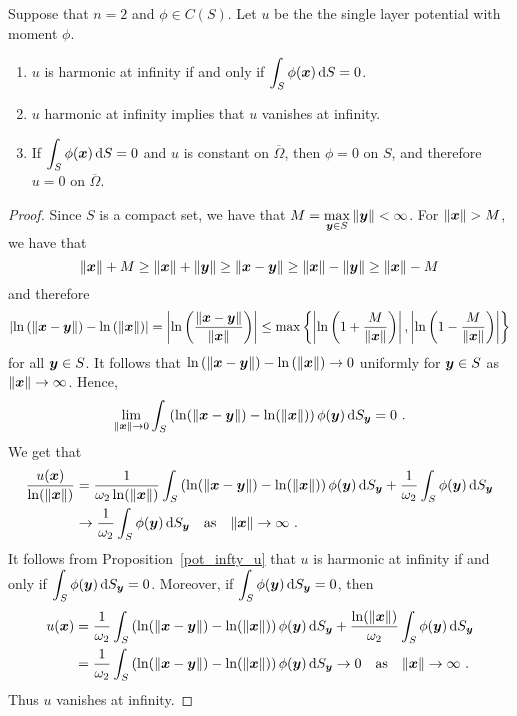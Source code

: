 \begin{lemma} \label{pot_1to1n2}
Suppose that $n=2$ and $\phi \in C(S)$.  Let $u$ be the
the single layer potential with moment $\phi$.
\begin{enumerate}
\item $u$ is harmonic at infinity if and only if
$\displaystyle \int_{S} \phi({\bm{x}}) \,\mathrm{d}{S} =0$.
\item $u$ harmonic at infinity implies that $u$ vanishes at infinity.
\item If $\displaystyle \int_{S} \phi({\bm{x}}) \,\mathrm{d}{S} =0$
and $u$ is constant on $\overline{\Omega}$, then $\phi=0$ on
$S$, and therefore $u=0$ on $\overline{\Omega}$.
\end{enumerate}
\end{lemma}

\begin{proof}
Since $S$ is a compact set, we have that
$\displaystyle M = \max_{{\bm{y}} \in S} \|{\bm{y}}\| < \infty$.
For $\|{\bm{x}}\| > M$, we have that
\[
\|{\bm{x}}\| + M \geq \|{\bm{x}}\| + \|{\bm{y}}\| \geq \|{\bm{x}} - {\bm{y}} \|
\geq \|{\bm{x}}\| - \|{\bm{y}}\|
\geq \|{\bm{x}}\| - M
\]
and therefore
\[
\left| \ln\left(\|{\bm{x}}-{\bm{y}}\|\right) -
\ln\left(\|{\bm{x}}\|\right) \right|
= \left| \ln\left(\frac{\|{\bm{x}}-{\bm{y}}\|}{\|{\bm{x}}\|}\right) \right|
\leq \max \left\{
\left| \ln\left(1 + \frac{M}{\|{\bm{x}}\|}\right) \right|,
\left| \ln\left(1 - \frac{M}{\|{\bm{x}}\|}\right) \right| \right\}
\]
for all ${\bm{y}} \in S$.   It follows that
$\ln\left(\|{\bm{x}}-{\bm{y}}\|\right) - \ln\left(\|{\bm{x}}\|\right) \to 0$
uniformly for ${\bm{y}} \in S$ as $\|{\bm{x}}\| \to \infty$.
Hence,
\[
\lim_{\|{\bm{x}}\|\to 0} \int_S \left( \ln(\|{\bm{x}}-{\bm{y}}\|) - \ln(\|{\bm{x}}\|)
\right) \phi({\bm{y}}) \,\mathrm{d}{S}_{{\bm{y}}} = 0 \ .
\]
We get that
\begin{align*}
\frac{u({\bm{x}})}{\ln(\|{\bm{x}}\|)}
&= \frac{1}{\omega_2 \ln(\|{\bm{x}}\|)}
\int_S \left( \ln(\|{\bm{x}}-{\bm{y}}\|) - \ln(\|{\bm{x}}\|)
\right) \phi({\bm{y}}) \,\mathrm{d}{S}_{{\bm{y}}}
+ \frac{1}{\omega_2} \int_S \phi({\bm{y}}) \,\mathrm{d}{S}_{{\bm{y}}} \\
&\to \frac{1}{\omega_2} \int_S \phi({\bm{y}}) \,\mathrm{d}{S}_{{\bm{y}}}
\quad \text{as} \quad \|{\bm{x}}\| \to \infty \ .
\end{align*}
It follows from Proposition~\ref{pot_infty_u} that $u$ is harmonic at
infinity if and only if
$\displaystyle \int_S \phi({\bm{y}}) \,\mathrm{d}{S}_{{\bm{y}}} = 0$.
Moreover, if $\displaystyle \int_S \phi({\bm{y}}) \,\mathrm{d}{S}_{{\bm{y}}} = 0$, then
\begin{align*}
u({\bm{x}})
&= \frac{1}{\omega_2}
\int_S \left( \ln(\|{\bm{x}}-{\bm{y}}\|) - \ln(\|{\bm{x}}\|)
\right) \phi({\bm{y}}) \,\mathrm{d}{S}_{{\bm{y}}}
+ \frac{\ln(\|{\bm{x}}\|)}{\omega_2} \int_S \phi({\bm{y}}) \,\mathrm{d}{S}_{{\bm{y}}} \\
&= \frac{1}{\omega_2}
\int_S \left( \ln(\|{\bm{x}}-{\bm{y}}\|) - \ln(\|{\bm{x}}\|)
\right) \phi({\bm{y}}) \,\mathrm{d}{S}_{{\bm{y}}}
\to 0 \quad \text{as} \quad \|{\bm{x}}\| \to \infty \ .
\end{align*}
Thus $u$ vanishes at infinity.


\end{proof}
